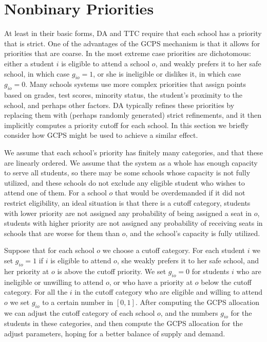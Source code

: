 \documentclass[12pt, A4paper]{article}
\theoremstyle{definition}
\begin{document}
\section{Nonbinary Priorities} \label{sec:Nonbinary}

At least in their basic forms, DA and TTC require that each school has a priority that is strict.  One of the advantages of the GCPS mechanism is that it allows for priorities that are coarse.  In the most extreme case priorities are dichotomous: either a student $i$ is eligible to attend a school $o$, and weakly prefers it to her safe school, in which case $g_{io} = 1$, or she is ineligible or dislikes it, in which case $g_{io} = 0$.  Many schools systems use more complex priorities that assign points based on grades, test scores, minority status, the student's proximity to the school, and perhaps other factors. DA typically refines these priorities by replacing them with (perhaps randomly generated) strict refinements, and it then implicitly computes a priority cutoff for each school.  In this section we briefly consider how GCPS might be used to achieve a similar effect.

We assume that each school's priority has finitely many categories, and that these are linearly ordered.  We assume that the system as a whole has enough capacity to serve all students, so there may be some schools whose capacity is not fully utilized, and these schools do not exclude any eligible student who wishes to attend one of them.  For a school $o$ that would be overdemanded if it did not restrict eligibility, an ideal situation is that there is a cutoff category, students with lower priority are not assigned any probability of being assigned a seat in $o$, students with higher priority are not assigned any probability of receiving seats in schools that are worse for them than $o$, and the school's capacity is fully utilized.  

Suppose that for each school $o$ we choose a cutoff category.  For each student $i$ we set $g_{io} = 1$ if $i$ is eligible to attend $o$, she weakly prefers it to her safe school, and her priority at $o$ is above the cutoff priority.  We set $g_{io} = 0$ for students $i$ who are ineligible or unwilling to attend $o$, or who have a priority at $o$ below the cutoff category. For all the $i$ in the cutoff category who are eligible and willing to attend $o$ we set $g_{io}$ to a certain number in $[0,1]$.
After computing the GCPS allocation we can adjust the cutoff category of each school $o$, and the numbers $g_{io}$ for the students in these categories, and then compute the GCPS allocation for the adjust parameters, hoping for a better balance of supply and demand.  
\end{document}
